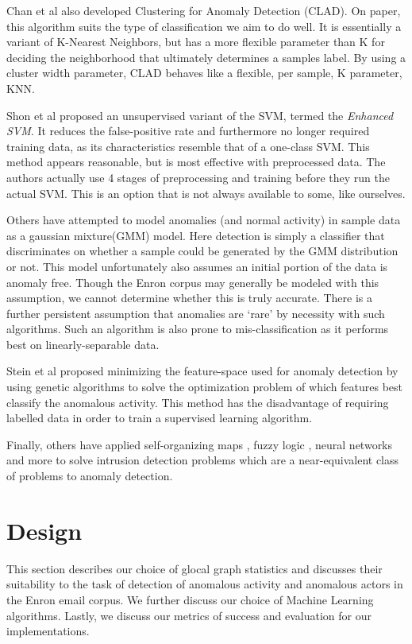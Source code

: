\documentclass[11pt,letterpaper]{article}
\begin{document}
Chan et al \cite{chan2003machine} also developed Clustering for Anomaly Detection (CLAD).
On paper, this algorithm suits the type of classification we aim to do well. It is
essentially a variant of K-Nearest Neighbors, but has a more flexible parameter than K
for deciding the neighborhood that ultimately determines a samples label. By using a 
cluster width parameter, CLAD behaves like a flexible, per sample, K parameter, KNN.

Shon et al \cite{shon2007hybrid} proposed an unsupervised variant of the SVM, termed
the \textit{Enhanced SVM}. It reduces the false-positive rate and furthermore no longer required 
training data, as its characteristics resemble that of a one-class SVM. This method appears
reasonable, but is most effective with preprocessed data. The authors actually use 4 stages of
preprocessing and training before they run the actual SVM. This is an option that is 
not always available to some, like ourselves.

Others \cite{eskin2000anomaly} have attempted to model anomalies (and normal activity)
in sample data as a gaussian mixture(GMM) model. Here detection is simply a classifier that
discriminates on whether a sample could be generated by the GMM distribution or not.
This model unfortunately also assumes an initial portion of the data is anomaly free.
Though the Enron corpus may generally be modeled with this assumption, we cannot
determine whether this is truly accurate. There is a further persistent assumption
that anomalies are `rare' by necessity with such algorithms. Such an algorithm is also
prone to mis-classification as it performs best on linearly-separable data.

Stein et al \cite{stein2005decision} proposed minimizing the feature-space used for 
anomaly detection by using genetic algorithms to solve the optimization problem of which
features best classify the anomalous activity. This method has the disadvantage of requiring
labelled data in order to train a supervised learning algorithm.

Finally, others have applied self-organizing maps \cite{rhodes2000multiple}, fuzzy logic \cite{zimmermann1992fuzzy}, neural networks \cite{mukkamala2002intrusion} and more to 
solve intrusion detection problems which are a near-equivalent class of problems to anomaly detection.

\section{Design}
This section describes our choice of glocal graph statistics and discusses their suitability
to the task of detection of anomalous activity and anomalous actors in the Enron email corpus.
We further discuss our choice of Machine Learning algorithms. Lastly, we discuss our metrics
of success and evaluation for our implementations.
\end{document}

